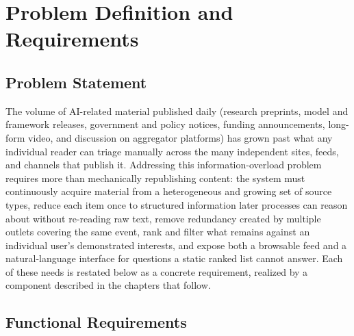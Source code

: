 \chapter{Problem Definition and Requirements}
\label{chap:requirements}

\section{Problem Statement}
\label{sec:req-problem}

The volume of AI-related material published daily (research preprints,
model and framework releases, government and policy notices, funding
announcements, long-form video, and discussion on aggregator platforms) has
grown past what any individual reader can triage manually across the many
independent sites, feeds, and channels that publish it. Addressing this
information-overload problem requires more than mechanically republishing
content: the system must continuously acquire material from a heterogeneous
and growing set of source types, reduce each item once to structured
information later processes can reason about without re-reading raw text,
remove redundancy created by multiple outlets covering the same event, rank
and filter what remains against an individual user's demonstrated interests,
and expose both a browsable feed and a natural-language interface for
questions a static ranked list cannot answer. Each of these needs is
restated below as a concrete requirement, realized by a component described
in the chapters that follow.

\section{Functional Requirements}
\label{sec:req-functional}


